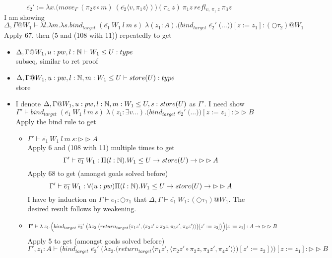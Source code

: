 \message{ !name(paper.tex)}\documentclass{article}
\begin{document}
\[\overline{e_2}' := \lambda x. \big(move_{\Gamma} \: (\pi_2 z \circ m) \: (\overline{e_2}\langle v,  \pi_1 z \rangle) \big) (\pi_4 \: z) \: \pi_1 z \: refl_{v, \: \pi_1 \: z} \: \pi_3 z\]
I am showing
\[\Delta,\Gamma@W_1 \vdash \lambda l. \lambda m . \lambda s. bind_{target}\;(\overline{e_1}\: W_1 \: l \: m \: s) \; \lambda (z_1 : A). \Big( bind_{target} \; \overline{e_2}'
\; 
\big( \dots \big) \Big) [z:= z_1]
: (\bigcirc \tau_2) @ W_1\]
Apply 67, then (5 and (108 with 11)) repeatedly to get
\begin{itemize}
    \item $\Delta,\Gamma@W_1, u: pw, l: \N \vdash W_1 \leq U: type$\\
    subseq, similar to ret proof
    \item $\Delta,\Gamma@W_1, u: pw, l: \N, m: W_1 \leq U \vdash store(U): type$\\
    store
    \item I denote $\Delta,\Gamma@W_1, u: pw, l: \N, m: W_1 \leq U, s: store(U)$ as $\Gamma'$. I need show
    \[\Gamma' \vdash bind_{target}\;(\overline{e_1}\: W_1 \: l \: m \: s) \; \lambda (z_1 : \exists v \dots ).\Big( bind_{target} \; \overline{e_2}'
\; 
\big( \dots \big) \Big) [z:= z_1] : \rhd \rhd B\]
Apply the bind rule to get
\begin{itemize}
    \item $\Gamma' \vdash \overline{e_1}\: W_1 \: l \: m \: s : \rhd \rhd A $\\
    Apply 6 and (108 with 11) multiple times to get
    \[\Gamma' \vdash \overline{e_1} \: W_1 : \Pi(l: \mathbb{N}). W_1 \leq U \rightarrow store(U) \rightarrow \rhd \rhd A\]
    Apply 68 to get (amongst goals solved before)
     \[\Gamma' \vdash \overline{e_1} \: W_1 : \forall(u: pw)\Pi(l: \mathbb{N}). W_1 \leq U \rightarrow store(U) \rightarrow \rhd \rhd A\]
    I have by induction on $\Gamma \vdash e_1 : \bigcirc \tau_1$ that $\Delta, \Gamma \vdash \overline{e_1} \: W_1 : (\bigcirc \tau_1) @ W_1$. The desired result follows by weakening. 
    \item \[\Gamma' \vdash \lambda \:z_1.\Big( bind_{target} \; \overline{e_2}'
\; \big(\lambda z_2. \big(return_{target}\langle \pi_1 z', \langle \pi_2 z' \circ \pi_2 z, \pi_3 z', \pi_4 z' \rangle \rangle \big)[z' := z_2]\big) \Big) [z:= z_1] : A \rightarrow \rhd \rhd B\]
Apply 5 to get (amongst goals solved before)
\[\Gamma', z_1: A  \vdash \Big( bind_{target} \; \overline{e_2}'
\; \big(\lambda z_2. \big(return_{target}\langle \pi_1 z', \langle \pi_2 z' \circ \pi_2 z, \pi_3 z', \pi_4 z' \rangle \rangle \big)[z' := z_2]\big) \Big) [z:= z_1] : \rhd \rhd B\]

\end{itemize}
\end{itemize}
\end{document}
